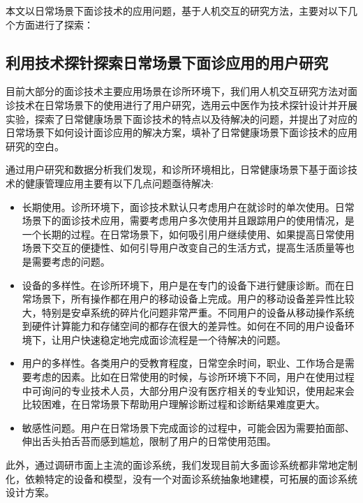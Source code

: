 本文以日常场景下面诊技术的应用问题，基于人机交互的研究方法，主要对以下几个方面进行了探索：

\subsection{利用技术探针探索日常场景下面诊应用的用户研究}

目前大部分的面诊技术主要应用场景在诊所环境下，我们用人机交互研究方法对面诊技术在日常场景下的使用进行了用户研究，选用云中医作为技术探针设计并开展实验，探索了日常健康场景下面诊技术的特点以及待解决的问题，并提出了对应的日常场景下如何设计面诊应用的解决方案，填补了日常健康场景下面诊技术的应用研究的空白\cite{ding2019reading}。

通过用户研究和数据分析我们发现，和诊所环境相比，日常健康场景下基于面诊技术的健康管理应用主要有以下几点问题亟待解决: 

\begin{itemize}
    
    \item 长期使用。诊所环境下，面诊技术默认只考虑用户在就诊时的单次使用。日常场景下的面诊技术应用，需要考虑用户多次使用并且跟踪用户的使用情况，是一个长期的过程。在日常场景下，如何吸引用户继续使用、如果提高日常使用场景下交互的便捷性、如何引导用户改变自己的生活方式，提高生活质量等也是需要考虑的问题。

    \item 设备的多样性。在诊所环境下，用户是在专门的设备下进行健康诊断。而在日常场景下，所有操作都在用户的移动设备上完成。用户的移动设备差异性比较大，特别是安卓系统的碎片化问题非常严重。不同用户的设备从移动操作系统到硬件计算能力和存储空间的都存在很大的差异性。如何在不同的用户设备环境下，让用户快速稳定地完成面诊流程是一个待解决的问题。
    
    \item 用户的多样性。各类用户的受教育程度，日常空余时间，职业、工作场合是需要考虑的因素。比如在日常使用的时候，与诊所环境下不同，用户在使用过程中可询问的专业技术人员，大部分用户没有医疗相关的专业知识，使用起来会比较困难，在日常场景下帮助用户理解诊断过程和诊断结果难度更大。
    
    \item 敏感性问题。用户在日常场景下完成面诊的过程中，可能会因为需要拍面部、伸出舌头拍舌苔而感到尴尬，限制了用户的日常使用范围。

\end{itemize}

此外，通过调研市面上主流的面诊系统，我们发现目前大多面诊系统都非常地定制化，依赖特定的设备和模型，没有一个对面诊系统抽象地建模，可拓展的面诊系统设计方案。

